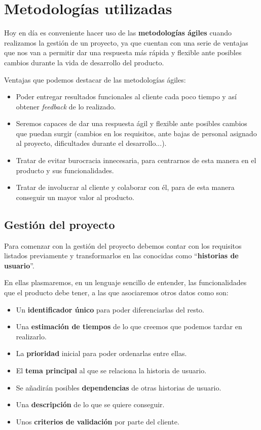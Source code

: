 \documentclass{\ClassPath/viu-tfm-template}
\begin{document}
\chapter{Metodologías utilizadas}

Hoy en día es conveniente hacer uso de las \textbf{metodologías ágiles} cuando realizamos la gestión de un proyecto, ya que cuentan con una serie de ventajas que nos van a permitir dar una respuesta más rápida y flexible ante posibles cambios durante la vida de desarrollo del producto.

Ventajas que podemos destacar de las metodologías ágiles:

\begin{itemize}
    \item Poder entregar resultados funcionales al cliente cada poco tiempo y así obtener \textit{feedback} de lo realizado.
    \item Seremos capaces de dar una respuesta ágil y flexible ante posibles cambios que puedan surgir (cambios en los requisitos, ante bajas de personal asignado al proyecto, dificultades durante el desarrollo...).
    \item Tratar de evitar burocracia innecesaria, para centrarnos de esta manera en el producto y sus funcionalidades.
    \item Tratar de involucrar al cliente y colaborar con él, para de esta manera conseguir un mayor valor al producto.
\end{itemize}

\section{Gestión del proyecto}

Para comenzar con la gestión del proyecto debemos contar con los requisitos listados previamente y transformarlos en las conocidas como “\textbf{historias de usuario}”.

En ellas plasmaremos, en un lenguaje sencillo de entender, las funcionalidades que el producto debe tener, a las que asociaremos otros datos como son:

\begin{itemize}
    \item Un \textbf{identificador único} para poder diferenciarlas del resto.
    \item Una \textbf{estimación de tiempos} de lo que creemos que podemos tardar en realizarlo.
    \item La \textbf{prioridad} inicial para poder ordenarlas entre ellas.
    \item El \textbf{tema principal} al que se relaciona la historia de usuario.
    \item Se añadirán posibles \textbf{dependencias} de otras historias de usuario.
    \item Una \textbf{descripción} de lo que se quiere conseguir.
    \item Unos \textbf{criterios de validación} por parte del cliente.
\end{itemize}
\end{document}
